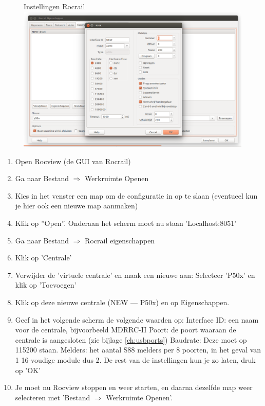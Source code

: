 \documentclass[12pt,a4paper]{report}
\begin{document}
\begin{figure}[!ht]
  \captionbox
  {Instellingen Rocrail\label{im:rocrail}}
  {\includegraphics[scale=0.4]{images/rcu_rocrail}\\}
\end{figure}

\begin{enumerate}
\item Open Rocview (de GUI van Rocrail)
\item Ga naar Bestand $\Rightarrow$ Werkruimte Openen
\item Kies in het venster een map om de configuratie in op te slaan (eventueel kun je hier ook een nieuwe map aanmaken)
\item Klik op ''Open''. Onderaan het scherm moet nu staan 'Localhost:8051'
\item Ga naar Bestand $\Rightarrow$ Rocrail eigenschappen
\item Klik op 'Centrale'
\item Verwijder de 'virtuele centrale' en maak een nieuwe aan: Selecteer 'P50x' en klik op 'Toevoegen'
\item Klik op deze nieuwe centrale (NEW --- P50x) en op Eigenschappen.
\item Geef in het volgende scherm de volgende waarden op:
\subitem Interface ID: een naam voor de centrale, bijvoorbeeld MDRRC-II
\subitem Poort: de poort waaraan de centrale is aangesloten (zie bijlage \ref{ch:usbports})
\subitem Baudrate: Deze moet op 115200 staan.
\subitem Melders: het aantal S88 melders per 8 poorten, in het geval van 1 16-voudige module dus 2.
\subitem De rest van de instellingen kun je zo laten, druk op 'OK'
\item Je moet nu Rocview stoppen en weer starten, en daarna dezelfde map weer selecteren met 'Bestand $\Rightarrow$ Werkruimte Openen'.
\end{enumerate}
\end{document}
